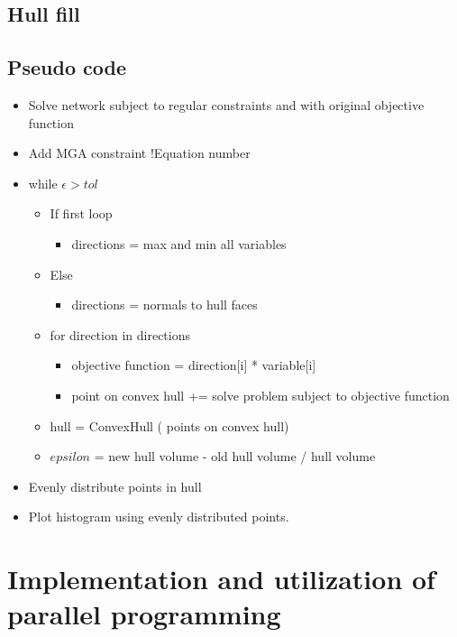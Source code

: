 \subsection{Hull fill}










\subsection{Pseudo code}

\begin{itemize}[label={}]
	\item Solve network subject to regular constraints and with original objective function
	\item Add MGA constraint !Equation number
	\item while $\epsilon>tol$
	\begin{itemize}[label={}]
		\item If first loop
		\begin{itemize}[label={}]
			\item directions = max and min all variables
		\end{itemize}
		\item Else
		\begin{itemize}[label={}]
			\item directions = normals to hull faces
		\end{itemize}
		\item for direction in directions
		\begin{itemize}[label={}]
			\item objective function = direction[i] * variable[i]
			\item point on convex hull += solve problem subject to objective function
		\end{itemize}
		\item hull = ConvexHull ( points on convex hull)
		\item $epsilon$ = new hull volume - old hull volume / hull volume
	\end{itemize}
	\item Evenly distribute points in hull 
	\item Plot histogram using evenly distributed points. 
\end{itemize}

\section{Implementation and utilization of parallel programming}






